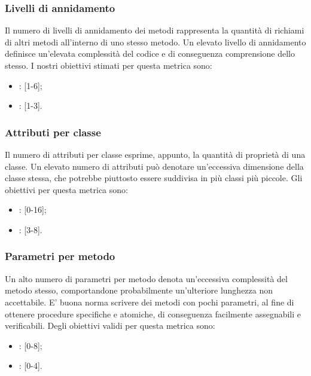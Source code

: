 \subsubsection{Livelli di annidamento}
\label{4.2.2}
Il numero di livelli di annidamento dei metodi rappresenta la quantità di richiami di altri metodi all'interno di uno stesso metodo.
Un elevato livello di annidamento definisce un'elevata complessità del codice e di conseguenza comprensione dello stesso.
I nostri obiettivi stimati per questa metrica sono:
\begin{itemize}
\item {}: [1-6];
\item {}: [1-3].
\end{itemize}

\subsubsection{Attributi per classe}
\label{4.2.3}
Il numero di attributi per classe esprime, appunto, la quantità di proprietà di una classe. Un elevato numero di attributi può denotare un'eccessiva dimensione della classe stessa, che potrebbe piuttosto essere suddivisa in più classi più piccole.
Gli obiettivi per questa metrica sono:
\begin{itemize}
\item {}: [0-16];
\item {}: [3-8].
\end{itemize}

\subsubsection{Parametri per metodo}
\label{4.2.4}
Un alto numero di parametri per metodo denota un'eccessiva complessità del metodo stesso, comportandone probabilmente un'ulteriore lunghezza non accettabile. E' buona norma scrivere dei metodi con pochi parametri, al fine di ottenere procedure specifiche e atomiche, di conseguenza facilmente assegnabili e verificabili.
Degli obiettivi validi per questa metrica sono:
\begin{itemize}
\item {}: [0-8];
\item {}: [0-4].
\end{itemize}

